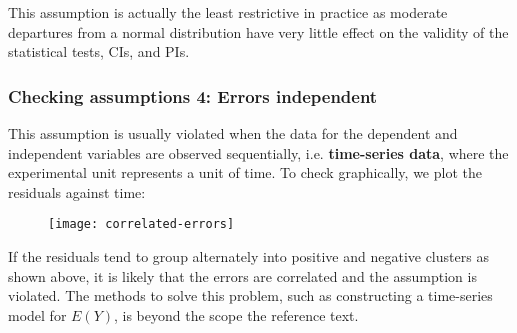 \documentclass{report}
\begin{document}
	This assumption is actually the least restrictive in practice as moderate departures from a normal distribution have very little effect on the validity of the statistical tests, CIs, and PIs. 
	
	\subsubsection{Checking assumptions 4: Errors independent}
	This assumption is usually violated when the data for the dependent and independent variables are observed sequentially, i.e. \textbf{time-series data}, where the experimental unit represents a unit of time. To check graphically, we plot the residuals against time:
	\begin{figure}[h]
		\centering
		\texttt{[image: correlated-errors]}
	\end{figure}
	
	If the residuals tend to group alternately into positive and negative clusters as shown above, it is likely that the errors are correlated and the assumption is violated. The methods to solve this problem, such as constructing a time-series model for $E(Y)$, is beyond the scope the reference text.
	
\end{document}

